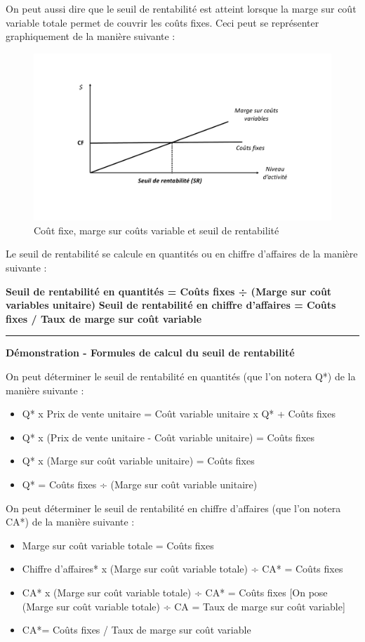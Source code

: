 \documentclass[oneside]{kaobook}
\begin{document}
On peut aussi dire que le seuil de rentabilité est atteint lorsque la marge sur coût variable totale permet de couvrir les coûts fixes. 
Ceci peut se représenter graphiquement de la manière suivante :
\begin{figure}[H]

\includegraphics{./img/srmcvcf.pdf}
\caption{Coût fixe, marge sur coûts variable et seuil de rentabilité}
\end{figure}

Le seuil de rentabilité se calcule en quantités ou en chiffre d'affaires de la manière suivante :
\begin{center}
\textbf{Seuil de rentabilité en quantités  =  Coûts fixes ÷ (Marge sur coût variables unitaire)}
\textbf{Seuil de rentabilité en chiffre d'affaires = Coûts fixes / Taux de marge sur coût variable}
\end{center}

\noindent\rule{\textwidth}{0.5pt}
\textbf{Démonstration -  Formules de calcul du seuil de rentabilité}

On peut déterminer le seuil de rentabilité en quantités (que l'on notera Q*) de la manière suivante :
\begin{itemize}
\item Q* x Prix de vente unitaire = Coût variable unitaire x Q* + Coûts fixes
\item Q* x (Prix de vente unitaire - Coût variable unitaire) =  Coûts fixes
\item Q* x (Marge sur coût variable unitaire) =  Coûts fixes
\item Q* =  Coûts fixes ÷ (Marge sur coût variable unitaire)
\end{itemize}
On peut déterminer le seuil de rentabilité en chiffre d'affaires (que l'on notera CA*) de la manière suivante :
\begin{itemize}
\item Marge sur coût variable totale =  Coûts fixes
\item Chiffre d'affaires* x (Marge sur coût variable totale) ÷ CA* =  Coûts fixes
\item CA* x (Marge sur coût variable totale) ÷ CA* =  Coûts fixes [On pose (Marge sur coût variable totale) ÷ CA = Taux de marge sur coût variable]
\item CA*= Coûts fixes / Taux de marge sur coût variable
\end{itemize}
\end{document}
